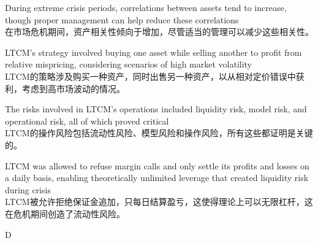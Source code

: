 \documentclass{article}
\begin{document}
    \begin{choices}
        \item During extreme crisis periods, correlations between assets tend to increase, though proper management can help reduce these correlations\\
        在市场危机期间，资产相关性倾向于增加，尽管适当的管理可以减少这些相关性。
        \item LTCM's strategy involved buying one asset while selling another to profit from relative mispricing, considering scenarios of high market volatility\\
        LTCM的策略涉及购买一种资产，同时出售另一种资产，以从相对定价错误中获利，考虑到高市场波动的情况。
        \item The risks involved in LTCM's operations included liquidity risk, model risk, and operational risk, all of which proved critical\\
        LTCM的操作风险包括流动性风险、模型风险和操作风险，所有这些都证明是关键的。
        \item LTCM was allowed to refuse margin calls and only settle its profits and losses on a daily basis, enabling theoretically unlimited leverage that created liquidity risk during crisis\\
        LTCM被允许拒绝保证金追加，只每日结算盈亏，这使得理论上可以无限杠杆，这在危机期间创造了流动性风险。
    \end{choices}
    
    \begin{correctanswer}
    D
    \end{correctanswer}
    
\end{document}
